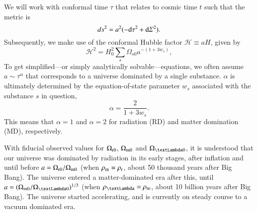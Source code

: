 








We will work with conformal time $\tau$ that relates to cosmic time $t$ such that the metric is%
\begin{equation}
    {ds}^2 = a^2 (-{\diff \tau}^2+ {\diff \varSigma}^2).
\end{equation}
Subsequently, we make use of the conformal Hubble factor $\mathcal{H}\equiv a H$, given by
\begin{equation}\label{eq:GR:lcdm:first_Friedmann_conformal}
    \mathcal{H}^2 = H_0^2 \sum_s \Omega_{s0} a^{-(1+3w_s)},
\end{equation}
To get simplified---or simply analytically solvable---equations, we often assume $a\sim \tau^\alpha$ that corresponds to a universe dominated by a single substance. $\alpha$ is ultimately determined by the equation-of-state parameter $w_s$ associated with the substance $s$ in question, 
\begin{equation}
    \alpha = \frac{2}{1+3w_s}.
\end{equation}
This means that $\alpha=1$ and $\alpha=2$ for radiation (RD) and matter domination (MD), respectively. %

With fiducial observed values for $\Omega_\mathrm{r0}$, $\Omega_\mathrm{m0}$ and $\Omega_{\text{\textLambda}0}$, it is understood that our universe was dominated by radiation in its early stages, after inflation and until before $a=\Omega_\mathrm{r0}/\Omega_\mathrm{m0}$ (when $\rho_\mathrm{m}=\rho_\mathrm{r}$, about 50 thousand years after Big Bang). The universe entered a matter-dominated era after this, until $a=(\Omega\ped{m0}/\Omega_{\text{\textLambda}0})^{1/3}$ (when $\rho_{\text{\textLambda}}=\rho\ped{m}$, about 10 billion years after Big Bang). The universe started accelerating, and is currently on steady course to a vacuum dominated era.


